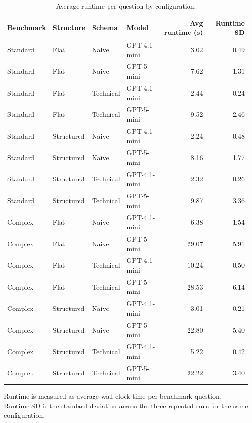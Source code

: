 \begin{table}[htbp]
\centering
\small
\caption{Average runtime per question by configuration.}
\label{tab:runtime}
\begin{tabular}{llllrr}
\toprule
Benchmark & Structure & Schema & Model & Avg runtime (s) & Runtime SD \\
\midrule
Standard & Flat & Naive & GPT-4.1-mini & 3.02 & 0.49 \\
Standard & Flat & Naive & GPT-5-mini & 7.62 & 1.31 \\
Standard & Flat & Technical & GPT-4.1-mini & 2.44 & 0.24 \\
Standard & Flat & Technical & GPT-5-mini & 9.52 & 2.46 \\
Standard & Structured & Naive & GPT-4.1-mini & 2.24 & 0.48 \\
Standard & Structured & Naive & GPT-5-mini & 8.16 & 1.77 \\
Standard & Structured & Technical & GPT-4.1-mini & 2.32 & 0.26 \\
Standard & Structured & Technical & GPT-5-mini & 9.87 & 3.36 \\
Complex & Flat & Naive & GPT-4.1-mini & 6.38 & 1.54 \\
Complex & Flat & Naive & GPT-5-mini & 29.07 & 5.91 \\
Complex & Flat & Technical & GPT-4.1-mini & 10.24 & 0.50 \\
Complex & Flat & Technical & GPT-5-mini & 28.53 & 6.14 \\
Complex & Structured & Naive & GPT-4.1-mini & 3.01 & 0.21 \\
Complex & Structured & Naive & GPT-5-mini & 22.80 & 5.40 \\
Complex & Structured & Technical & GPT-4.1-mini & 15.22 & 0.42 \\
Complex & Structured & Technical & GPT-5-mini & 22.22 & 3.40 \\
\bottomrule
\end{tabular}
\par\footnotesize{Runtime is measured as average wall-clock time per benchmark question. Runtime SD is the standard deviation across the three repeated runs for the same configuration.}
\end{table}
